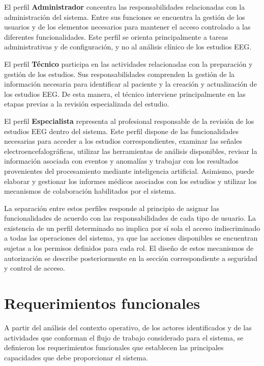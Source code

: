 El perfil \textbf{Administrador} concentra las responsabilidades relacionadas
con la administración del sistema. Entre sus funciones se encuentra la gestión
de los usuarios y de los elementos necesarios para mantener el acceso
controlado a las diferentes funcionalidades. Este perfil se orienta
principalmente a tareas administrativas y de configuración, y no al análisis
clínico de los estudios EEG.

El perfil \textbf{Técnico} participa en las actividades relacionadas con la
preparación y gestión de los estudios. Sus responsabilidades comprenden la
gestión de la información necesaria para identificar al paciente y la creación
y actualización de los estudios EEG. De esta manera, el técnico interviene
principalmente en las etapas previas a la revisión especializada del estudio.

El perfil \textbf{Especialista} representa al profesional responsable de la
revisión de los estudios EEG dentro del sistema. Este perfil dispone de las
funcionalidades necesarias para acceder a los estudios correspondientes,
examinar las señales electroencefalográficas, utilizar las herramientas de
análisis disponibles, revisar la información asociada con eventos y anomalías
y trabajar con los resultados provenientes del procesamiento mediante
inteligencia artificial. Asimismo, puede elaborar y gestionar los informes
médicos asociados con los estudios y utilizar los mecanismos de colaboración
habilitados por el sistema.

La separación entre estos perfiles responde al principio de asignar las
funcionalidades de acuerdo con las responsabilidades de cada tipo de usuario.
La existencia de un perfil determinado no implica por sí sola el acceso
indiscriminado a todas las operaciones del sistema, ya que las acciones
disponibles se encuentran sujetas a los permisos definidos para cada rol. El
diseño de estos mecanismos de autorización se describe posteriormente en la
sección correspondiente a seguridad y control de acceso.


\section{Requerimientos funcionales}
\label{sec:requerimientos-funcionales}

A partir del análisis del contexto operativo, de los actores identificados y
de las actividades que conforman el flujo de trabajo considerado para
el sistema, se definieron los requerimientos funcionales que establecen las
principales capacidades que debe proporcionar el sistema.

